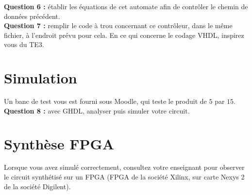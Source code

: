 \documentclass[a4paper,11pt]{article}
\begin{document}
{\bf Question 6 :} établir les équations de cet automate afin de contrôler le chemin de données précédent.\\

{\bf Question 7 :} remplir le code à trou concernant ce contrôleur, dans le même fichier, à l'endroit prévu pour cela. En ce qui concerne le codage VHDL, inspirez vous du TE3.\\

\section{Simulation}

Un banc de test vous est fourni sous Moodle, qui teste le produit de $5$ par $15$.\\

{\bf Question 8 :} avec GHDL, analyser puis simuler votre circuit.

\section{Synthèse FPGA}

Lorsque vous avez simulé correctement, consultez votre enseignant pour observer le circuit synthétisé sur un FPGA (FPGA de la société Xilinx, sur carte Nexys 2 de la société Digilent).
\end{document}
